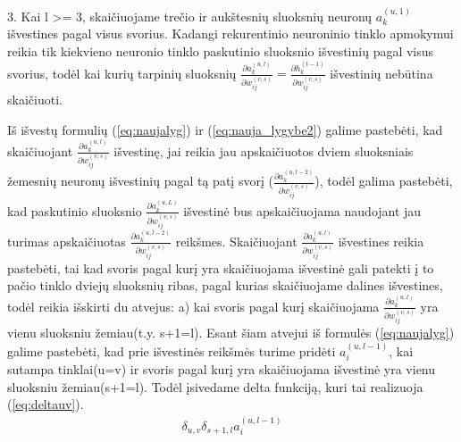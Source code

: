 3. Kai l >= 3, skaičiuojame trečio ir aukštesnių sluoksnių neuronų \begin{math}a_k^{(u,1)}\end{math} išvestines pagal visus svorius. Kadangi rekurentinio neuroninio tinklo apmokymui reikia tik kiekvieno neuronio tinklo paskutinio sluoksnio išvestinių pagal visus svorius, todėl kai kurių tarpinių sluoksnių \begin{math}\frac{\partial a_k^{(u, l)}}{\partial w_{ij}^{(v,s)}} = \frac{\partial h_k^{(t-1)}}{\partial w_{ij}^{(v,s)}}\end{math} išvestinių nebūtina skaičiuoti.

Iš išvestų formulių (\ref{eq:naujalyg}) ir (\ref{eq:nauja_lygybe2}) galime pastebėti, kad skaičiuojant \begin{math}\frac{\partial a_k^{(u, l)}}{\partial w_{ij}^{(v,s)}}\end{math} išvestinę, jai reikia jau apskaičiuotos dviem sluoksniais žemesnių neuronų išvestinių pagal tą patį svorį (\begin{math}\frac{\partial a_k^{(u, l-2)}}{\partial w_{ij}^{(v,s)}}\end{math}), todėl galima pastebėti, kad paskutinio sluoksnio \begin{math}\frac{\partial a_k^{(u, L)}}{\partial w_{ij}^{(v,s)}}\end{math} išvestinė bus apskaičiuojama naudojant jau turimas apskaičiuotas  \begin{math}\frac{\partial a_k^{(u, l-2)}}{\partial w_{ij}^{(v,s)}}\end{math} reikšmes. Skaičiuojant \begin{math}\frac{\partial a_k^{(u, l)}}{\partial w_{ij}^{(v,s)}}\end{math} išvestines reikia pastebėti, tai kad svoris pagal kurį yra skaičiuojama išvestinė gali patekti į to pačio tinklo dviejų sluoksnių ribas, pagal kurias skaičiuojame dalines išvestines, todėl reikia išskirti du atvejus:
  a) kai svoris pagal kurį skaičiuojama \begin{math}\frac{\partial a_k^{(u, l)}}{\partial w_{ij}^{(v,s)}}\end{math} yra vienu sluoksniu žemiau(t.y. s+1=l).
    Esant šiam atvejui iš formulės (\ref{eq:naujalyg}) galime pastebėti, kad prie išvestinės reikšmės turime pridėti \begin{math}a_i^{(u,l-1)}\end{math}, kai sutampa tinklai(u=v) ir svoris pagal kurį yra skaičiuojama išvestinė yra vienu sluoksniu žemiau(s+1=l). Todėl įsivedame delta funkciją, kuri tai realizuoja (\ref{eq:deltauv}).
    \begin{equation}\label{eq:deltauv}
      \begin{aligned}
        \delta_{u,v}\delta_{s+1,l}a_i^{(u,l-1)}
      \end{aligned}
    \end{equation}


